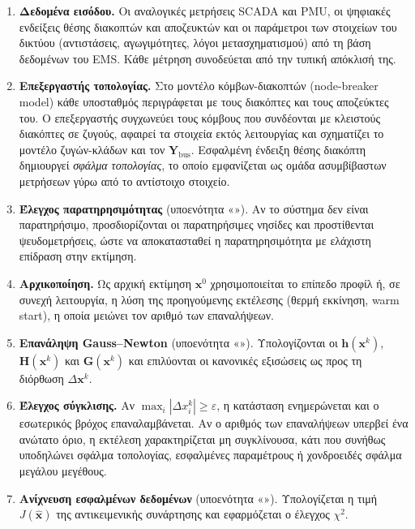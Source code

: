 \begin{enumerate}
\item \textbf{Δεδομένα εισόδου.} Οι αναλογικές μετρήσεις SCADA και PMU, οι ψηφιακές ενδείξεις
      θέσης διακοπτών και αποζευκτών και οι παράμετροι των στοιχείων του δικτύου (αντιστάσεις,
      αγωγιμότητες, λόγοι μετασχηματισμού) από τη βάση δεδομένων του EMS. Κάθε μέτρηση
      συνοδεύεται από την τυπική απόκλισή της.
\item \textbf{Επεξεργαστής τοπολογίας.} Στο μοντέλο κόμβων-διακοπτών (node-breaker model)
      κάθε υποσταθμός περιγράφεται με τους διακόπτες και τους αποζεύκτες του. Ο επεξεργαστής
      συγχωνεύει τους κόμβους που συνδέονται με κλειστούς διακόπτες σε ζυγούς, αφαιρεί τα
      στοιχεία εκτός λειτουργίας και σχηματίζει το μοντέλο ζυγών-κλάδων και τον
      $\mathbf{Y}_{\mathrm{bus}}$. Εσφαλμένη ένδειξη θέσης διακόπτη δημιουργεί \emph{σφάλμα
      τοπολογίας}, το οποίο εμφανίζεται ως ομάδα ασυμβίβαστων μετρήσεων γύρω από το
      αντίστοιχο στοιχείο.
\item \textbf{Έλεγχος παρατηρησιμότητας} (υποενότητα «»). Αν το σύστημα δεν είναι
      παρατηρήσιμο, προσδιορίζονται οι παρατηρήσιμες νησίδες και προστίθενται
      ψευδομετρήσεις, ώστε να αποκατασταθεί η παρατηρησιμότητα με ελάχιστη επίδραση στην
      εκτίμηση.
\item \textbf{Αρχικοποίηση.} Ως αρχική εκτίμηση $\mathbf{x}^{0}$ χρησιμοποιείται το επίπεδο
      προφίλ ή, σε συνεχή λειτουργία, η λύση της προηγούμενης εκτέλεσης (θερμή εκκίνηση,
      warm start), η οποία μειώνει τον αριθμό των επαναλήψεων.
\item \textbf{Επανάληψη Gauss--Newton} (υποενότητα «»). Υπολογίζονται οι
      $\mathbf{h}(\mathbf{x}^{k})$, $\mathbf{H}(\mathbf{x}^{k})$ και $\mathbf{G}(\mathbf{x}^{k})$ και
      επιλύονται οι κανονικές εξισώσεις ως προς τη διόρθωση $\Delta\mathbf{x}^{k}$.
\item \textbf{Έλεγχος σύγκλισης.} Αν $\max_i |\Delta x_i^{k}| \ge \varepsilon$, η κατάσταση
      ενημερώνεται και ο εσωτερικός βρόχος επαναλαμβάνεται. Αν ο αριθμός των επαναλήψεων
      υπερβεί ένα ανώτατο όριο, η εκτέλεση χαρακτηρίζεται μη συγκλίνουσα, κάτι που συνήθως
      υποδηλώνει σφάλμα τοπολογίας, εσφαλμένες παραμέτρους ή χονδροειδές σφάλμα μεγάλου
      μεγέθους.
\item \textbf{Ανίχνευση εσφαλμένων δεδομένων} (υποενότητα «»). Υπολογίζεται η τιμή
      $J(\hat{\mathbf{x}})$ της αντικειμενικής συνάρτησης και εφαρμόζεται ο έλεγχος
      $\chi^2$.

\end{enumerate}
